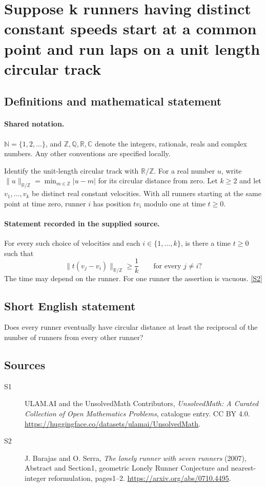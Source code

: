 \documentclass[11pt]{article}
\newcommand{\sref}[2]{\hyperlink{source:#1:#2}{[S#2]}}
\begin{document}
\section{Suppose k runners having distinct constant speeds start at a common point and run laps on a unit length circular track}\label{statement}

\subsection{Definitions and mathematical statement}

\paragraph{Shared notation.}$\mathbb N=\{1,2,\ldots\}$, and $\mathbb Z,\mathbb Q,\mathbb R,\mathbb C$ denote the integers, rationals, reals and complex numbers. Any other conventions are specified locally.


Identify the unit-length circular track with $\mathbb R/\mathbb Z$. For a real number $u$, write $\|u\|_{\mathbb R/\mathbb Z}=\min_{m\in\mathbb Z}|u-m|$ for its circular distance from zero. Let $k\ge2$ and let $v_1,\ldots,v_k$ be distinct real constant velocities. With all runners starting at the same point at time zero, runner $i$ has position $tv_i$ modulo one at time $t\ge0$.

\paragraph{Statement recorded in the supplied source.}
For every such choice of velocities and each $i\in\{1,\ldots,k\}$, is there a time $t\ge0$ such that
\[\|t(v_j-v_i)\|_{\mathbb R/\mathbb Z}\ge\frac1k\qquad\text{for every }j\ne i?\]
The time may depend on the runner. For one runner the assertion is vacuous. \sref{statement}{2}

\subsection{Short English statement}
Does every runner eventually have circular distance at least the reciprocal of the number of runners from every other runner?
\subsection{Sources}
\begin{description}
\item[\hypertarget{source:statement:1}{S1}] ULAM.AI and the UnsolvedMath Contributors, \emph{UnsolvedMath: A Curated Collection of Open Mathematics Problems}, catalogue entry. CC BY 4.0. \url{https://huggingface.co/datasets/ulamai/UnsolvedMath}.
\item[\hypertarget{source:statement:2}{S2}] J. Barajas and O. Serra, \emph{The lonely runner with seven runners} (2007), Abstract and Section1, geometric Lonely Runner Conjecture and nearest-integer reformulation, pages1--2. \url{https://arxiv.org/abs/0710.4495}.
\end{description}
\label{end:statement}
\end{document}
